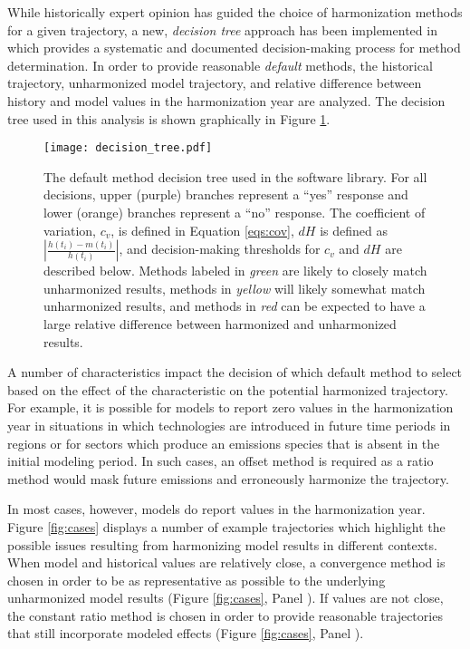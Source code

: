 While historically expert opinion has guided the choice of harmonization methods
for a given trajectory, a new, \textit{decision tree} approach has been
implemented in  which provides a systematic and documented
decision-making process for method determination. In order to provide reasonable
\textit{default} methods, the historical trajectory, unharmonized model
trajectory, and relative difference between history and model values in the
harmonization year are analyzed. The decision tree used in this analysis is
shown graphically in Figure \ref{fig:decision_tree}.


\begin{figure}
  \begin{center}
    \texttt{[image: decision\_tree.pdf]}
    \caption[]{
      \label{fig:decision_tree}
      The default method decision tree used in the  software
      library. For all decisions, upper (purple) branches represent a ``yes''
      response and lower (orange) branches represent a ``no'' response. The
      coefficient of variation, $c_v$, is defined in Equation \ref{eqs:cov},
      $dH$ is defined as $\left|\frac{h(t_i) - m(t_i)}{h(t_i)}\right|$, and
      decision-making thresholds for $c_v$ and $dH$ are described below. Methods
      labeled in \textit{green} are likely to closely match unharmonized
      results, methods in \textit{yellow} will likely somewhat match
      unharmonized results, and methods in \textit{red} can be expected to have
      a large relative difference between harmonized and unharmonized results.}
  \end{center}
\end{figure}

A number of characteristics impact the decision of which default method to
select based on the effect of the characteristic on the potential harmonized
trajectory. For example, it is possible for models to report zero values in the
harmonization year in situations in which technologies are introduced in future
time periods in regions or for sectors which produce an emissions species that
is absent in the initial modeling period. In such cases, an offset method is
required as a ratio method would mask future emissions and erroneously harmonize
the trajectory. 

In most cases, however, models do report values in the harmonization
year. Figure \ref{fig:cases} displays a number of example trajectories which
highlight the possible issues resulting from harmonizing model results in
different contexts. When model and historical values are relatively close, a
convergence method is chosen in order to be as representative as possible to the
underlying unharmonized model results (Figure \ref{fig:cases}, Panel
). If values are not close, the constant ratio method is chosen in order
to provide reasonable trajectories that still incorporate modeled effects
(Figure \ref{fig:cases}, Panel ). 

